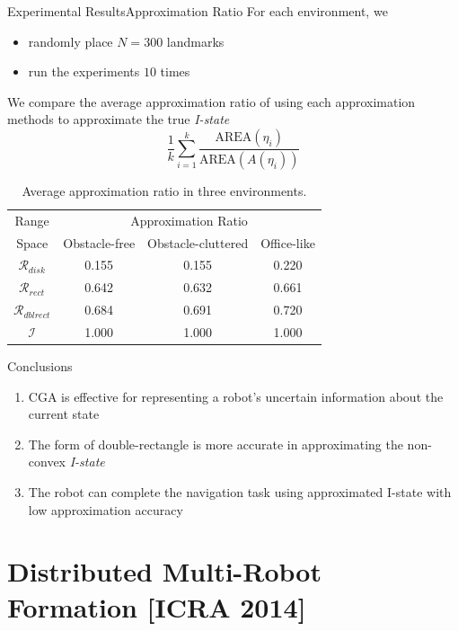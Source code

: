 \documentclass[10pt]{beamer}
\begin{document}
\begin{frame}{Experimental Results}{Approximation Ratio}
  For each environment, we
  \begin{itemize}
  \item randomly place $N = 300$ landmarks 
  \item run the  experiments $10$ times
  \end{itemize} 
  \begin{block}{}
    We compare the average approximation ratio of using each approximation methods
    to approximate  the true \emph{I-state}
    $$\frac{1}{k} \sum_{i=1}^k \frac{\text{AREA}(\eta_i)}{\text{AREA}(A(\eta_i))}$$
  \end{block}
\begin{table}
  \footnotesize\centering
    \begin{tabular}{cccc} 
    \hline
    Range  & \multicolumn{3}{c}{Approximation  Ratio}  \\
    Space  & Obstacle-free & Obstacle-cluttered & Office-like\\
    \hline
      $\mathcal{R}_{disk}$ & 0.155  & 0.155   & 0.220 \\ 
    \hline
    $\mathcal{R}_{rect}$  & 0.642   & 0.632  & 0.661 \\
    \hline
    $\mathcal{R}_{dblrect}$ & 0.684 & 0.691  & 0.720 \\
    \hline
    $\mathcal{I}$ & 1.000  & 1.000  & 1.000 \\
    \hline
    \end{tabular}
    \caption{\scriptsize{Average approximation ratio in three environments.}}
\end{table}

\end{frame}

\begin{frame}{Conclusions}
  \begin{enumerate}
  \item CGA is effective for representing a robot's uncertain information about
    the current state
  \item The form of double-rectangle is more accurate in approximating the non-convex
    \emph{I-state}
  \item The robot can complete the navigation task using approximated I-state with
    low approximation accuracy
  \end{enumerate}
\end{frame}

\section{Distributed Multi-Robot Formation [ICRA 2014]}
\end{document}
